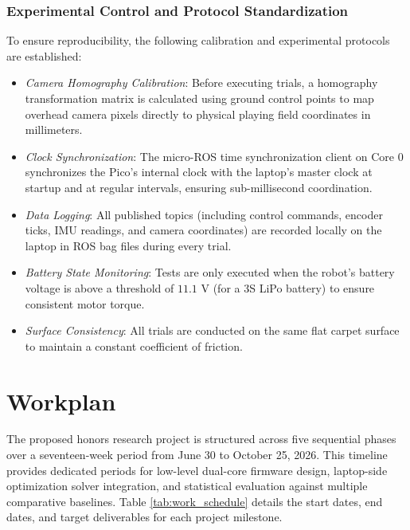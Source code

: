 \documentclass[a4paper,twoside,12pt]{report}
\begin{document}
\subsection{Experimental Control and Protocol Standardization}

To ensure reproducibility, the following calibration and experimental protocols are established:
\begin{itemize}
\item \textit{Camera Homography Calibration}: Before executing trials, a homography transformation matrix is calculated using ground control points to map overhead camera pixels directly to physical playing field coordinates in millimeters.
\item \textit{Clock Synchronization}: The micro-ROS time synchronization client on Core 0 synchronizes the Pico's internal clock with the laptop's master clock at startup and at regular intervals, ensuring sub-millisecond coordination.
\item \textit{Data Logging}: All published topics (including control commands, encoder ticks, IMU readings, and camera coordinates) are recorded locally on the laptop in ROS bag files during every trial.
\item \textit{Battery State Monitoring}: Tests are only executed when the robot's battery voltage is above a threshold of $11.1\text{ V}$ (for a 3S LiPo battery) to ensure consistent motor torque.
\item \textit{Surface Consistency}: All trials are conducted on the same flat carpet surface to maintain a constant coefficient of friction.
\end{itemize}

\chapter{Workplan}\label{chapter: workplan}

The proposed honors research project is structured across five sequential phases over a seventeen-week period from June 30 to October 25, 2026. This timeline provides dedicated periods for low-level dual-core firmware design, laptop-side optimization solver integration, and statistical evaluation against multiple comparative baselines. Table \ref{tab:work_schedule} details the start dates, end dates, and target deliverables for each project milestone.
\end{document}
